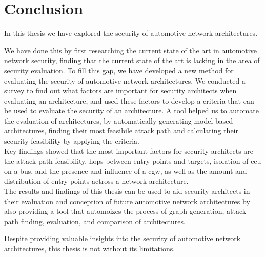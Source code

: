 \chapter{Conclusion}
\label{chp:conclusion}

In this thesis we have explored the security of automotive network architectures.\\\par

We have done this by first researching the current state of the art in automotive network security,
finding that the current state of the art is lacking in the area of security evaluation.
To fill this gap, we have developed a new method for evaluating the security of automotive network architectures.
We conducted a survey to find out what factors are important for security architects when evaluating an architecture,
and used these factors to develop a criteria that can be used to evaluate the security of an architecture.
A tool helped us to automate the evaluation of architectures, by automatically generating model-based architectures,
finding their most feasibile attack path and calculating their security feasibility by applying the criteria.\\

Key findings showed that the most important factors for security architects are the attack path feasibility,
hops between entry points and targets, isolation of \gls{ecu} on a bus, and the presence and influence of a \gls{cgw},
as well as the amount and distribution of entry points actross a network architecture.\\

The results and findings of this thesis can be used to aid security architects in their evaluation 
and conception of future automotive network architectures by also providing a 
tool that automoizes the process of graph generation, attack path finding, evaluation, and comparison of architectures.\\\par

Despite providing valuable insights into the security of automotive network architectures,
this thesis is not without its limitations.\\

